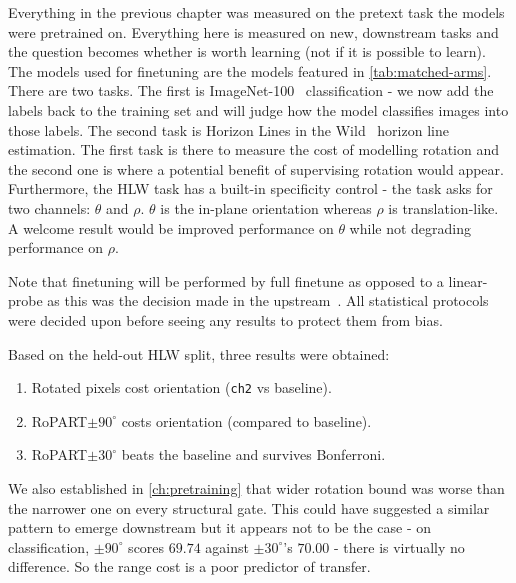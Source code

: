 \documentclass[final_report.tex]{subfiles}
\begin{document}
\label{ch:downstream}

Everything in the previous chapter was measured on the pretext task the models were pretrained on. Everything here is measured on new, downstream tasks and the question becomes whether \dphi{} is worth learning (not if it is possible to learn). The models used for finetuning are the models featured in \cref{tab:matched-arms}. There are two tasks. The first is ImageNet-100~\cite{cmc} classification - we now add the labels back to the training set and will judge how the model classifies images into those labels. The second task is Horizon Lines in the Wild~\cite{hlw} horizon line estimation. The first task is there to measure the cost of modelling rotation and the second one is where a potential benefit of supervising rotation would appear. Furthermore, the HLW task has a built-in specificity control - the task asks for two channels: $\theta$ and $\rho$. $\theta$  is the in-plane orientation whereas $\rho$ is translation-like. A welcome result would be improved performance on $\theta$ while not degrading performance on $\rho$.

Note that finetuning will be performed by full finetune as opposed to a linear-probe as this was the decision made in the upstream~\cite{part}. All statistical protocols were decided upon before seeing any results to protect them from bias.

Based on the held-out HLW split, three results were obtained:
\begin{enumerate}
\item Rotated pixels cost orientation (\texttt{ch2} vs baseline).
\item RoPART$\pm90^\circ$ costs orientation (compared to baseline).
\item RoPART$\pm30^\circ$ beats the baseline and survives Bonferroni.
\end{enumerate}

We also established in \cref{ch:pretraining} that wider rotation bound was worse than the narrower one on every structural gate. This could have suggested a similar pattern to emerge downstream but it appears not to be the case - on classification, $\pm90^\circ$ scores $69.74$ against $\pm30^\circ$'s $70.00$ - there is virtually no difference. So the range cost is a poor predictor of transfer.
\end{document}
